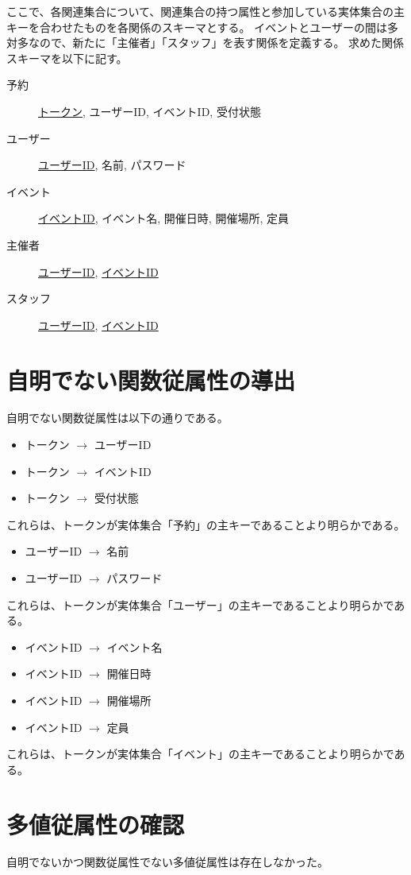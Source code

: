 \documentclass[dvipdfmx]{jarticle}
\begin{document}
ここで、各関連集合について、関連集合の持つ属性と参加している実体集合の主キーを合わせたものを各関係のスキーマとする。
イベントとユーザーの間は多対多なので、新たに「主催者」「スタッフ」を表す関係を定義する。
求めた関係スキーマを以下に記す。

\begin{description}
  \item[予約] \underline{トークン}, ユーザーID, イベントID, 受付状態
  \item[ユーザー] \underline{ユーザーID}, 名前, パスワード
  \item[イベント] \underline{イベントID}, イベント名, 開催日時, 開催場所, 定員
  \item[主催者] \underline{ユーザーID}, \underline{イベントID}  
  \item[スタッフ] \underline{ユーザーID}, \underline{イベントID}
\end{description}

\section{自明でない関数従属性の導出}
自明でない関数従属性は以下の通りである。
\begin{itemize}
  \item {トークン} $\rightarrow$ {ユーザーID}
  \item {トークン} $\rightarrow$ {イベントID}
  \item {トークン} $\rightarrow$ {受付状態}
\end{itemize}
これらは、トークンが実体集合「予約」の主キーであることより明らかである。
\begin{itemize}
  \item {ユーザーID} $\rightarrow$ {名前}
  \item {ユーザーID} $\rightarrow$ {パスワード}
\end{itemize}
これらは、トークンが実体集合「ユーザー」の主キーであることより明らかである。
\begin{itemize}
  \item {イベントID} $\rightarrow$ {イベント名}
  \item {イベントID} $\rightarrow$ {開催日時}
  \item {イベントID} $\rightarrow$ {開催場所}
  \item {イベントID} $\rightarrow$ {定員}
\end{itemize}
これらは、トークンが実体集合「イベント」の主キーであることより明らかである。

\section{多値従属性の確認}
自明でないかつ関数従属性でない多値従属性は存在しなかった。
\end{document}
